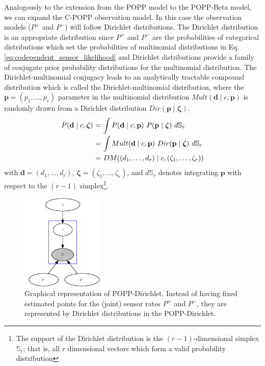 Analogously to the extension from the POPP model to the POPP-Beta model, we can expand the C-POPP observation model. In this case the observation models ($P^+$ and $P^-$) will follow Dirichlet distributions. The Dirichlet distribution is an appropriate distribution since $P^+$ and $P^-$ are the probabilities of categorical distributions which set the probabilities of multinomial distributions in Eq. \ref{eq:codependent_sensor_likelihood} and Dirichlet distributions provide a family of conjugate prior probability distributions for the multinomial distribution. The Dirichlet-multinomial conjugacy leads to an analytically tractable compound distribution which is called the Dirichlet-multinomial distribution, where the $\mathbf{p} = (p_1, \ldots, p_r)$ parameter in the multinomial distribution $Mult(\mathbf{d} \mid c, \mathbf{p})$ is randomly drawn from a Dirichlet distribution $Dir(\mathbf{p} \mid \boldsymbol{\zeta})$. 
\begin{equation}
	\label{eq:beta_binomial_revisit}
	\begin{tabular}{r@{ = }l}
        $P(\mathbf{d} \mid c, \boldsymbol{\zeta})$ & $\displaystyle\int P(\mathbf{d} \mid c, \mathbf{p}) ~ P(\mathbf{p} \mid \boldsymbol{\zeta}) ~d\mathbb S_r$ \\ [2ex]
        & $\displaystyle\int Mult(\mathbf{d} \mid c, \mathbf{p}) ~ Dir(\mathbf{p} \mid \boldsymbol{\zeta}) ~d\mathbb S_r$ \\ [2ex]
        & $DM((d_1, \ldots, d_r) \mid c, (\zeta_1, \ldots, \zeta_r))$
	\end{tabular}
\end{equation}
\noindent with $\mathbf{d} = (d_1, \ldots, d_r)$, $\boldsymbol{\zeta} = (\zeta_1, \ldots, \zeta_r)$, and $d\mathbb S_r$ denotes integrating $\mathbf{p}$ with respect to the $(r - 1)$ simplex\footnote{The support of the Dirichlet distribution is the $(r - 1)$-dimensional simplex $\mathbb S_r$; that is, all $r$ dimensional vectors which form a valid probability distribution}.

\begin{figure}[t!]
	\centering
	\includegraphics[width=0.35\textwidth]{./figures/popd-pics.pdf}
	\caption{Graphical representation of POPP-Dirichlet. Instead of having fixed estimated points for the (joint) sensor rates $P^+$ and $P^-$, they are represented by Dirichlet distributions in the POPP-Dirichlet.}
	\label{fig:gm_popp_dir}
	\vspace{-20pt}
\end{figure}

